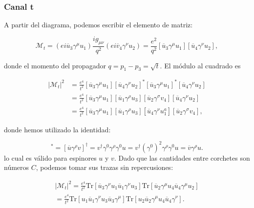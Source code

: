\subsubsection{Canal t}
A partir del diagrama, podemos escribir el elemento de matriz:

\begin{equation}
\mathcal{M}_t = (ei\overline{u}_3\gamma^\mu u_1) \frac{ig_{\mu\nu}}{q^2} (ei\overline{v}_4\gamma^\nu u_2) = \frac{e^2}{q^2} [\overline{u}_3\gamma^\mu u_1][\overline{u}_4\gamma^\nu u_2],
\end{equation}

donde el momento del propagador $ q = p_1 - p_3 = \sqrt{t} $. El módulo al cuadrado es

\begin{equation}
\begin{aligned}
|\mathcal{M}_t|^2 &= \frac{e^4}{t^2} [\overline{u}_3\gamma^\mu u_1][\overline{u}_4\gamma^\nu u_2]^* [\overline{u}_3\gamma^\mu u_1]^*[\overline{u}_4\gamma^\nu u_2] \\
&= \frac{e^4}{t^2} [\overline{u}_3\gamma^\mu u_1][\overline{u}_1 \gamma^\rho u_3] [\overline{u}_2 \gamma^\sigma v_4] [\overline{u}_4\gamma^\nu u_2] \\
&= \frac{e^4}{t^2} [\overline{u}_3\gamma^\mu u_1][\overline{u}_1 \gamma^\rho u_3] [\overline{u}_4\gamma^\nu u_1^a][\overline{u}_2 \gamma^\sigma v_4],
\end{aligned}
\end{equation}

donde hemos utilizado la identidad:

\begin{equation}
[\overline{u} \gamma^\rho v]^* = [\overline{u} \gamma^\rho v]^\dagger = v^\dagger \gamma^0 \gamma^\rho \gamma^0 u = v^\dagger (\gamma^0)^2 \gamma^\rho \gamma^0 u = \overline{v} \gamma^\rho u.
\end{equation}
lo cual es válido para espinores $ u $ y $ v $. Dado que las cantidades entre corchetes son números $ C $, podemos tomar sus trazas sin repercusiones:

\begin{equation}
  \begin{aligned}
    |\mathcal{M}_t|^2 = \frac{e^4}{t^2} \text{Tr}[\overline{u}_3\gamma^\nu u_1 \overline{u}_1 \gamma^\nu u_3] \text{Tr}[\overline{u}_2 \gamma^\mu u_4 \overline{u}_4 \gamma^\mu u_2] \\ = \frac{e^4}{t^2} \text{Tr}[u_1 \overline{u}_1 \gamma^\nu u_3 \overline{u}_3 \gamma^\mu] \text{Tr}[u_2 \overline{u}_2 \gamma^\mu u_4 \overline{u}_4 \gamma^\nu].
  \end{aligned}

\end{equation}

